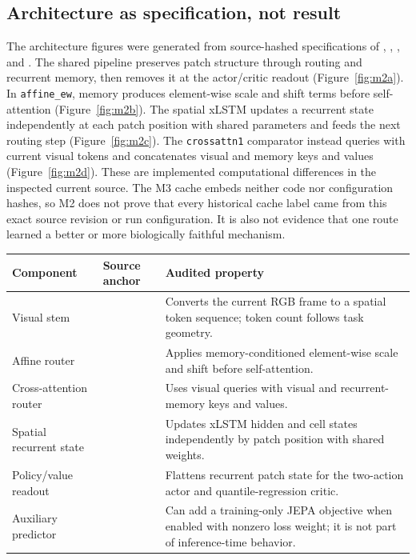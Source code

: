 \documentclass[11pt,a4paper]{article}
\newcommand{\env}[1]{\texttt{#1}}
\begin{document}
\subsection{Architecture as specification, not result}
The architecture figures were generated from source-hashed specifications of , , , and . The shared pipeline preserves patch structure through routing and recurrent memory, then removes it at the actor/critic readout (Figure~\ref{fig:m2a}). In \env{affine\_ew}, memory produces element-wise scale and shift terms before self-attention (Figure~\ref{fig:m2b}). The spatial xLSTM updates a recurrent state independently at each patch position with shared parameters and feeds the next routing step (Figure~\ref{fig:m2c}). The \env{crossattn1} comparator instead queries with current visual tokens and concatenates visual and memory keys and values (Figure~\ref{fig:m2d}). These are implemented computational differences in the inspected current source. The M3 cache embeds neither code nor configuration hashes, so M2 does not prove that every historical cache label came from this exact source revision or run configuration. It is also not evidence that one route learned a better or more biologically faithful mechanism.

\label{tab:architecture-components}
\begin{tabularx}{\textwidth}{@{}p{2.8cm}p{4.2cm}Y@{}}
\toprule
Component & Source anchor & Audited property\\
\midrule
Visual stem &  & Converts the current RGB frame to a spatial token sequence; token count follows task geometry.\\
Affine router &  & Applies memory-conditioned element-wise scale and shift before self-attention.\\
Cross-attention router &  & Uses visual queries with visual and recurrent-memory keys and values.\\
Spatial recurrent state &  & Updates xLSTM hidden and cell states independently by patch position with shared weights.\\
Policy/value readout &  & Flattens recurrent patch state for the two-action actor and quantile-regression critic.\\
Auxiliary predictor &  & Can add a training-only JEPA objective when enabled with nonzero loss weight; it is not part of inference-time behavior.\\
\bottomrule
\end{tabularx}
\end{document}
